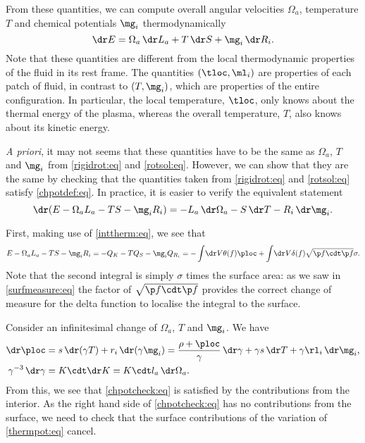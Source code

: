 From these quantities, we can compute overall angular velocities $\Omega_a$, temperature $T$ and chemical potentials $\mg_i$ thermodynamically
%
\begin{equation}\label{chpotdef:eq}
  \dr E = \Omega_a \,\dr L_a + T \,\dr S + \mg_i \,\dr R_i.
\end{equation}
%
Note that these quantities are different from the local thermodynamic properties of the fluid in its rest frame. The quantities $(\tloc,\ml_i)$ are properties of each patch of fluid, in contrast to $(T,\mg_i)$, which are properties of the entire configuration. In particular, the local temperature, $\tloc$, only knows about the thermal energy of the plasma, whereas the overall temperature, $T$, also knows about its kinetic energy.

\emph{A priori}, it may not seems that these quantities have to be the same as $\Omega_a$, $T$ and $\mg_i$ from \eqref{rigidrot:eq} and \eqref{rotsol:eq}. However, we can show that they are the same by checking that the quantities  taken from \eqref{rigidrot:eq} and \eqref{rotsol:eq} satisfy \eqref{chpotdef:eq}. In practice, it is easier to verify the equivalent statement
%
\begin{equation}\label{chpotcheck:eq}
  \dr(E -\Omega_a L_a - T S - \mg_i R_i) = - L_a \,\dr \Omega_a - S \,\dr T - R_i \,\dr \mg_i.
\end{equation}
%

First, making use of \eqref{inttherm:eq}, we see that
%
\begin{equation}\label{thermpot:eq}
  E -\Omega_a L_a - T S - \mg_i R_i = -Q_K - T Q_S - \mg_i Q_{R_i}
   = - \int\!\dr V \theta(f) \ploc + \int\!\dr V \delta(f) \sqrt{\p f\cdt\p f} \sigma.
\end{equation}
%
Note that the second integral is simply $\sigma$ times the surface area: as we saw in \eqref{surfmeasure:eq} the factor of $\sqrt{\p f\cdt\p f}$ provides the correct change of measure for the delta function to localise the integral to the surface.

Consider an infinitesimal change of $\Omega_a$, $T$ and $\mg_i$. We have
%
\begin{equation*}
\begin{split}
  \dr \ploc &= s\,\dr(\gamma T) + r_i\,\dr(\gamma\mg_i) = \frac{\rho+\ploc}{\gamma}\,\dr\gamma + \gamma s\,\dr T +\gamma  \rl_i\,\dr\mg_i,\\
  \gamma^{-3}\,\dr\gamma &= K\cdt\dr K = K\cdt l_a \,\dr\Omega_a.
\end{split}
\end{equation*}
%
From this, we see that \eqref{chpotcheck:eq} is satisfied by the contributions from the interior. As the right hand side of \eqref{chpotcheck:eq} has no contributions from the surface, we need to check that the surface contributions of the variation of \eqref{thermpot:eq} cancel.

